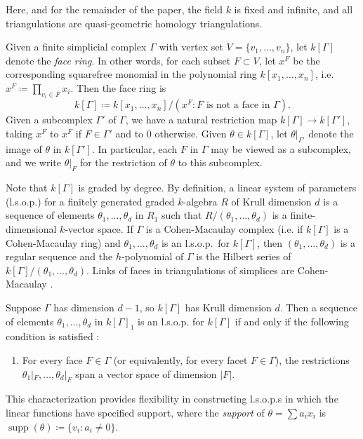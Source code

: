\documentclass[ALCO, Unicode,published]{cedram}
\DeclareMathOperator{\supp}{supp}
\begin{document}
Here, and for the remainder of the paper, the field $k$ is fixed and infinite, and all triangulations are quasi-geometric homology triangulations.

 Given a finite simplicial complex $\Gamma$ with vertex set $V = \{v_1, \ldots, v_n\}$, let $k[\Gamma]$ denote the \emph{face ring}. In other words, for each subset $F \subset V$, let $x^F$ be the corresponding squarefree monomial in the polynomial ring $k[x_1, \ldots, x_n]$, i.e.
 $
 x^F \coloneqq  \prod_{v_i \in F} x_i.
 $ 
 Then the face ring is
 \[
 k[\Gamma]  \coloneqq  k[x_1, \ldots, x_n] / (x^F : F \mbox{ is not a face in } \Gamma).
 \]
Given a subcomplex $\Gamma'$ of $\Gamma$, we have a natural restriction map $k[\Gamma] \rightarrow  k[\Gamma']$, taking $x^F$ to $x^F$ if $F \in \Gamma'$ and to 0 otherwise. Given $\theta \in k[\Gamma]$, let $\theta|_{\Gamma'}$ denote the image of $\theta$ in $k[\Gamma']$. In particular, each $F$ in $\Gamma$ may be viewed as a subcomplex, and we write $\theta|_F$ for the restriction of $\theta$ to this subcomplex.

Note that $k[\Gamma]$ is graded by degree. By definition, a linear system of parameters (l.s.o.p.) for a finitely generated graded $k$-algebra $R$ of Krull dimension $d$ is a sequence of elements $\theta_1, \ldots, \theta_d$ in $R_1$ such that $R/(\theta_1, \ldots, \theta_d)$ is a finite-dimensional $k$-vector space. If $\Gamma$ is a Cohen-Macaulay complex (i.e. if $k[\Gamma]$ is a Cohen-Macaulay ring) and $\theta_1, \ldots, \theta_d$ is an l.s.o.p.\ for $k[\Gamma]$, then $(\theta_1, \ldots, \theta_d)$ is a regular sequence and the $h$-polynomial of $\Gamma$ is the Hilbert series of $k[\Gamma]/(\theta_1, \ldots, \theta_d)$.  Links of faces in triangulations of simplices are Cohen-Macaulay \cite{Reisner76}. 

Suppose $\Gamma$ has dimension $d-1$, so $k[\Gamma]$ has Krull dimension $d$.  Then a sequence of elements $\theta_1, \ldots, \theta_d$ in $k[\Gamma]_1$ is an l.s.o.p. for $k[\Gamma]$ if and only if the following condition is satisfied \cite[Lemma~2.4(a)]{Stanley96}:


\begin{enumerate}[label=(*)]
\item \label{it1} For every face $F \in \Gamma$ (or equivalently, for every facet $F \in \Gamma$), the restrictions $\theta_1|_F, \ldots, \theta_d|_F$ span a vector space of dimension $|F|$. 
\end{enumerate}

This characterization provides flexibility in constructing l.s.o.p.s in which the linear functions have specified support, where the \emph{support} of $\theta = \sum a_i x_i$ is $\supp(\theta)  \coloneqq  \{ v_i : a_i \neq 0 \}$.
\end{document}
